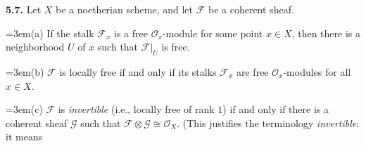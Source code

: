 {\smallskip
\noindent\hypertarget{ex-II-5.7}{}\textbf{5.7.} Let $X$ be a noetherian scheme, and let $\mathcal F$ be a coherent sheaf.

\noindent\hangindent=3em\hspace*{1.7em}(a) If the stalk $\mathcal F_x$ is a free $\mathcal O_x$-module for some point $x\in X$, then there is a neighborhood $U$ of $x$ such that $\mathcal F|_U$ is free.

\noindent\hangindent=3em\hspace*{1.7em}(b) $\mathcal F$ is locally free if and only if its stalks $\mathcal F_x$ are free $\mathcal O_x$-modules for all $x\in X$.

\noindent\hangindent=3em\hspace*{1.7em}(c) $\mathcal F$ is \emph{invertible} (i.e., locally free of rank $1$) if and only if there is a coherent sheaf $\mathcal G$ such that $\mathcal F\otimes\mathcal G\cong\mathcal O_X$. (This justifies the terminology \emph{invertible}: it means}
